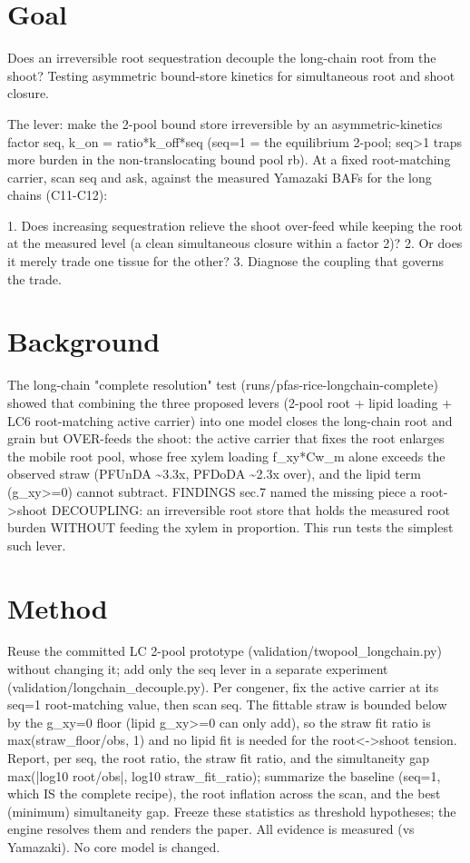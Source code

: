 \documentclass{article}
\begin{document}
\section{Goal}
Does an irreversible root sequestration decouple the long-chain root from the shoot? Testing asymmetric bound-store kinetics for simultaneous root and shoot closure.

The lever: make the 2-pool bound store irreversible by an asymmetric-kinetics
factor seq, k\_on = ratio*k\_off*seq (seq=1 = the equilibrium 2-pool; seq>1 traps
more burden in the non-translocating bound pool rb). At a fixed root-matching
carrier, scan seq and ask, against the measured Yamazaki BAFs for the long chains
(C11-C12):

1. Does increasing sequestration relieve the shoot over-feed while keeping the root
   at the measured level (a clean simultaneous closure within a factor 2)?
2. Or does it merely trade one tissue for the other?
3. Diagnose the coupling that governs the trade.

\section{Background}
The long-chain "complete resolution" test (runs/pfas-rice-longchain-complete)
showed that combining the three proposed levers (2-pool root + lipid loading +
LC6 root-matching active carrier) into one model closes the long-chain root and
grain but OVER-feeds the shoot: the active carrier that fixes the root enlarges
the mobile root pool, whose free xylem loading f\_xy*Cw\_m alone exceeds the
observed straw (PFUnDA \textasciitilde{}3.3x, PFDoDA \textasciitilde{}2.3x over), and the lipid term (g\_xy>=0)
cannot subtract. FINDINGS sec.7 named the missing piece a root->shoot DECOUPLING:
an irreversible root store that holds the measured root burden WITHOUT feeding the
xylem in proportion. This run tests the simplest such lever.

\section{Method}
Reuse the committed LC 2-pool prototype (validation/twopool\_longchain.py) without
changing it; add only the seq lever in a separate experiment
(validation/longchain\_decouple.py). Per congener, fix the active carrier at its
seq=1 root-matching value, then scan seq. The fittable straw is bounded below by
the g\_xy=0 floor (lipid g\_xy>=0 can only add), so the straw fit ratio is
max(straw\_floor/obs, 1) and no lipid fit is needed for the root<->shoot tension.
Report, per seq, the root ratio, the straw fit ratio, and the simultaneity gap
max(|log10 root/obs|, log10 straw\_fit\_ratio); summarize the baseline (seq=1, which
IS the complete recipe), the root inflation across the scan, and the best (minimum)
simultaneity gap. Freeze these statistics as threshold hypotheses; the engine
resolves them and renders the paper. All evidence is measured (vs Yamazaki). No
core model is changed.
\end{document}
